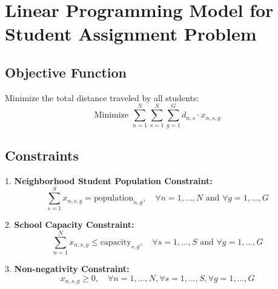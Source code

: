 \documentclass{article}
\begin{document}
\section*{Linear Programming Model for Student Assignment Problem}

\subsection*{Objective Function}
Minimize the total distance traveled by all students:
\[
\text{Minimize } \sum_{n=1}^{N} \sum_{s=1}^{S} \sum_{g=1}^{G} d_{n,s} \cdot x_{n,s,g}
\]

\subsection*{Constraints}

1. \textbf{Neighborhood Student Population Constraint:}
\[
\sum_{s=1}^{S} x_{n,s,g} = \text{population}_{n,g}, \quad \forall n = 1, \ldots, N \text{ and } \forall g = 1, \ldots, G
\]

2. \textbf{School Capacity Constraint:}
\[
\sum_{n=1}^{N} x_{n,s,g} \leq \text{capacity}_{s,g}, \quad \forall s = 1, \ldots, S \text{ and } \forall g = 1, \ldots, G
\]

3. \textbf{Non-negativity Constraint:}
\[
x_{n,s,g} \geq 0, \quad \forall n = 1, \ldots, N, \forall s = 1, \ldots, S, \forall g = 1, \ldots, G
\]
\end{document}
